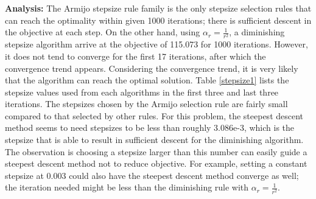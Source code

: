 \documentclass[11pt]{article}
\newcommand\analysis{\vspace{.10in}\textbf{Analysis: }}
\begin{document}
\analysis The Armijo stepsize rule family is the only stepsize selection rules that can reach the optimality within given 1000 iterations; there is sufficient descent in the objective at each step. On the other hand, using $\alpha_r=\frac{1}{r^2}$, a diminishing stepsize algorithm arrive at the objective of 115.073 for 1000 iterations. However, it does not tend to converge for the first 17 iterations, after which the convergence trend appears. Considering the convergence trend, it is very likely that the algorithm can reach the optimal solution. Table \ref{stepsize1} lists the stepsize values used from each algorithms in the first three and last three iterations. The stepsizes chosen by the Armijo selection rule are fairly small compared to that selected by other rules. For this problem, the steepest descent method seems to need stepsizes to be less than roughly 3.086e-3, which is the stepsize that is able to result in sufficient descent for the diminishing algorithm. The observation is choosing a stepsize larger than this number can easily guide a steepest descent method not to reduce objective. For example, setting a constant stepsize at 0.003 could also have the steepest descent method converge as well; the iteration needed might be less than the diminishing rule with $\alpha_r=\frac{1}{r^2}$.
\end{document}
